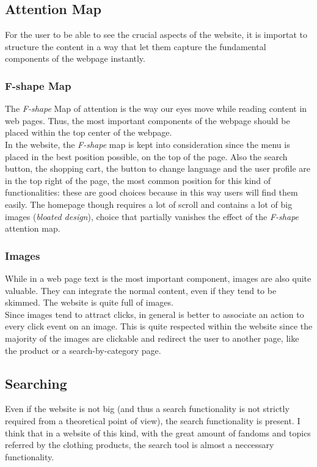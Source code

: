 \subsection{Attention Map}
For the user to be able to see the crucial aspects of the website, it is importat to structure the content in a way that let
them capture the fundamental components of the webpage instantly.

\subsubsection{F-shape Map}
The \textit{F-shape} Map of attention is the way our eyes move while reading content in web pages. Thus, the most important 
components of the webpage should be placed within the top center of the webpage. \\
In the website, the \textit{F-shape} map is kept into consideration since the menu is placed in the best 
position possible, on the top of the page. Also the search button, the shopping cart, the button to change language 
and the user profile are in the top right of the page, the most common position for this kind of functionalities: 
these are good choices because in this way users will find them easily. 
The homepage though requires a lot of scroll and contains a lot of big images (\textit{bloated design}), choice that partially 
vanishes the effect of the \textit{F-shape} attention map.

\subsubsection{Images}
While in a web page text is the most important component, images are also quite valuable. 
They can integrate the normal content, even if they tend to be skimmed.
The website is quite full of images. \\
Since images tend to attract clicks, in general is better to associate an action to every click event on an image.
This is quite respected within the website since the majority of the images are clickable and redirect the user to another page, 
like the product or a search-by-category page.

\subsection{Searching}
Even if the website is not big (and thus a search functionality is not strictly required from a theoretical point of view),
the search functionality is present. I think that in a website of this kind, with the great amount of fandoms and topics referred by
the clothing products, the search tool is almost a neccessary functionality. 

